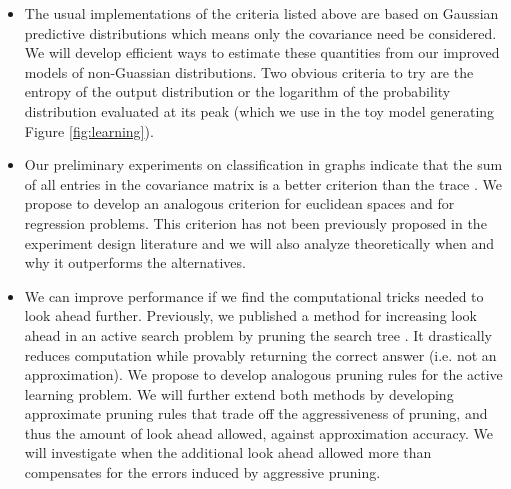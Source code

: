 \documentclass[prd,nofootbib,floatfix,11pt,tightenlines,nofootinbib]{revtex4}
\begin{document}
\vspace{.5\baselineskip}
\begin{itemize}

\item The usual implementations of the criteria listed above are based on
  Gaussian predictive distributions which means only the covariance need be
  considered.  We will develop efficient ways to estimate these quantities
  from our improved models of non-Guassian distributions.  Two obvious criteria to try
  are the entropy of the output distribution or the logarithm of the probability
  distribution evaluated at its peak (which we use in the toy model
  generating Figure \ref{fig:learning}).

\item Our preliminary experiments on classification in graphs indicate that
  the sum of all entries in the covariance matrix is a better criterion
  than the trace \cite{YifeiMa12}.  We propose to develop an analogous
  criterion for euclidean spaces and for regression problems.  This
  criterion has not been previously proposed in the experiment design
  literature and we will also analyze theoretically when and why it
  outperforms the alternatives.

\item We can improve performance if we find the computational tricks needed
  to look ahead further.  Previously, we published a method for increasing
  look ahead in an active search problem by pruning the search tree
  \cite{Garnett12}.  It drastically reduces computation while provably
  returning the correct answer (i.e. not an approximation).  We propose to
  develop analogous pruning rules for the active learning problem.  We will
  further extend both methods by developing approximate pruning rules that
  trade off the aggressiveness of pruning, and thus the amount of look
  ahead allowed, against approximation accuracy.  We will investigate when
  the additional look ahead allowed more than compensates for the errors
  induced by aggressive pruning.

\end{itemize}
\vspace{.5\baselineskip}
\end{document}
